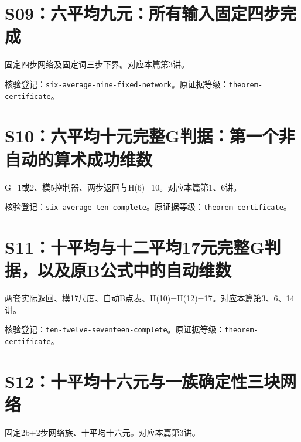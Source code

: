 \section{S09：六平均九元：所有输入固定四步完成}\label{source:S09}

固定四步网络及固定词三步下界。对应本篇第3讲。

\par{}\par

核验登记：{\small\nolinkurl{six-average-nine-fixed-network}}。原证据等级：{\small\nolinkurl{theorem-certificate}}。

\section{S10：六平均十元完整G判据：第一个非自动的算术成功维数}\label{source:S10}

G=1或2、模5控制器、两步返回与H(6)=10。对应本篇第1、6讲。

\par{}\par

核验登记：{\small\nolinkurl{six-average-ten-complete}}。原证据等级：{\small\nolinkurl{theorem-certificate}}。

\section{S11：十平均与十二平均17元完整G判据，以及原B公式中的自动维数}\label{source:S11}

两套实际返回、模17尺度、自动B点表、H(10)=H(12)=17。对应本篇第3、6、14讲。

\par{}\par

核验登记：{\small\nolinkurl{ten-twelve-seventeen-complete}}。原证据等级：{\small\nolinkurl{theorem-certificate}}。

\section{S12：十平均十六元与一族确定性三块网络}\label{source:S12}

固定2b+2步网络族、十平均十六元。对应本篇第3讲。

